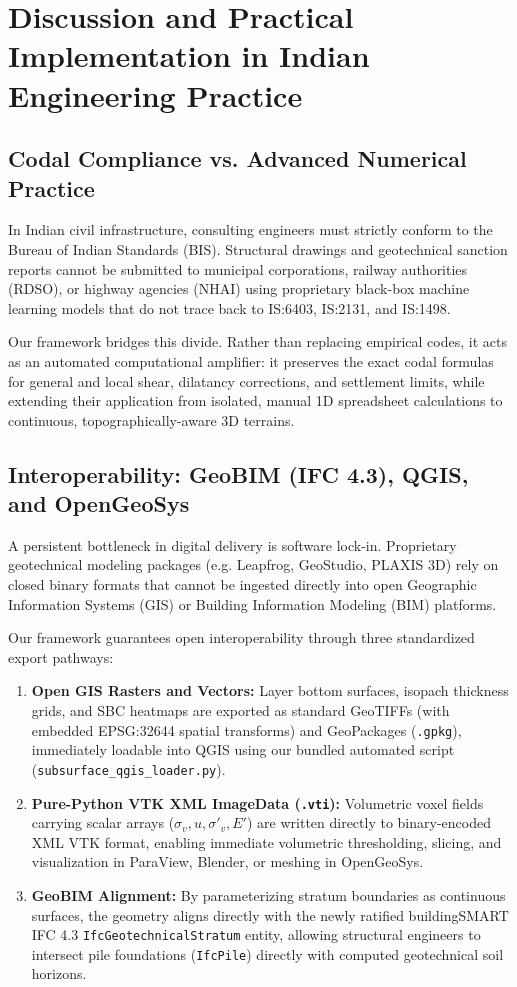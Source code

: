 \documentclass[11pt,a4paper]{article}
\begin{document}
\section{Discussion and Practical Implementation in Indian Engineering Practice}

\subsection{Codal Compliance vs. Advanced Numerical Practice}
In Indian civil infrastructure, consulting engineers must strictly conform to the Bureau of Indian Standards (BIS). Structural drawings and geotechnical sanction reports cannot be submitted to municipal corporations, railway authorities (RDSO), or highway agencies (NHAI) using proprietary black-box machine learning models that do not trace back to IS:6403, IS:2131, and IS:1498.

Our framework bridges this divide. Rather than replacing empirical codes, it acts as an automated computational amplifier: it preserves the exact codal formulas for general and local shear, dilatancy corrections, and settlement limits, while extending their application from isolated, manual 1D spreadsheet calculations to continuous, topographically-aware 3D terrains.

\subsection{Interoperability: GeoBIM (IFC 4.3), QGIS, and OpenGeoSys}
A persistent bottleneck in digital delivery is software lock-in. Proprietary geotechnical modeling packages (e.g. Leapfrog, GeoStudio, PLAXIS 3D) rely on closed binary formats that cannot be ingested directly into open Geographic Information Systems (GIS) or Building Information Modeling (BIM) platforms.

Our framework guarantees open interoperability through three standardized export pathways:
\begin{enumerate}
    \item \textbf{Open GIS Rasters and Vectors:} Layer bottom surfaces, isopach thickness grids, and SBC heatmaps are exported as standard GeoTIFFs (with embedded EPSG:32644 spatial transforms) and GeoPackages (\texttt{.gpkg}), immediately loadable into QGIS using our bundled automated script (\texttt{subsurface\_qgis\_loader.py}).
    \item \textbf{Pure-Python VTK XML ImageData (\texttt{.vti}):} Volumetric voxel fields carrying scalar arrays ($\sigma_v, u, \sigma'_v, E'$) are written directly to binary-encoded XML VTK format, enabling immediate volumetric thresholding, slicing, and visualization in ParaView, Blender, or meshing in OpenGeoSys.
    \item \textbf{GeoBIM Alignment:} By parameterizing stratum boundaries as continuous surfaces, the geometry aligns directly with the newly ratified buildingSMART IFC 4.3 \texttt{IfcGeotechnicalStratum} entity, allowing structural engineers to intersect pile foundations (\texttt{IfcPile}) directly with computed geotechnical soil horizons.
\end{enumerate}
\end{document}
